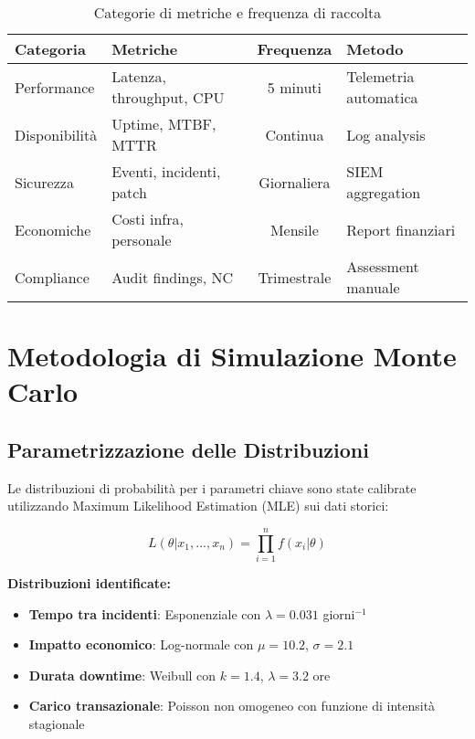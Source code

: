 \begin{table}[htbp]
\centering
\caption{Categorie di metriche e frequenza di raccolta}
\begin{tabular}{|l|l|c|l|}
\hline
\textbf{Categoria} & \textbf{Metriche} & \textbf{Frequenza} & \textbf{Metodo} \\
\hline
Performance & Latenza, throughput, CPU & 5 minuti & Telemetria automatica \\
Disponibilità & Uptime, MTBF, MTTR & Continua & Log analysis \\
Sicurezza & Eventi, incidenti, patch & Giornaliera & SIEM aggregation \\
Economiche & Costi infra, personale & Mensile & Report finanziari \\
Compliance & Audit findings, NC & Trimestrale & Assessment manuale \\
\hline
\end{tabular}
\end{table}

\section{\texorpdfstring{Metodologia di Simulazione Monte Carlo}{A.3 - Metodologia di Simulazione Monte Carlo}}

\subsection{\texorpdfstring{Parametrizzazione delle Distribuzioni}{A.3.1 - Parametrizzazione delle Distribuzioni}}

Le distribuzioni di probabilità per i parametri chiave sono state calibrate utilizzando Maximum Likelihood Estimation (MLE) sui dati storici:

\begin{equation}
L(\theta|x_1,...,x_n) = \prod_{i=1}^{n} f(x_i|\theta)
\end{equation}

\textbf{Distribuzioni identificate:}
\begin{itemize}
    \item \textbf{Tempo tra incidenti}: Esponenziale con $\lambda = 0.031$ giorni$^{-1}$
    \item \textbf{Impatto economico}: Log-normale con $\mu = 10.2$, $\sigma = 2.1$
    \item \textbf{Durata downtime}: Weibull con $k = 1.4$, $\lambda = 3.2$ ore
    \item \textbf{Carico transazionale}: Poisson non omogeneo con funzione di intensità stagionale
\end{itemize}

